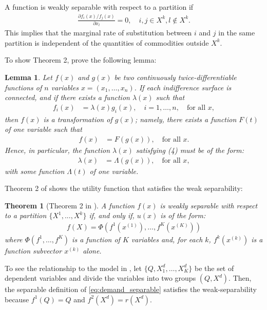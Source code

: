 \documentclass[11pt, a4paper]{article}
\newtheorem{theorem}{Theorem}
\newtheorem{lemma}{Lemma}
\theoremstyle{remark}
\begin{document}
A function is weakly separable with respect to a partition if 
\begin{align}
    \frac{\partial f_i(x)/ f_j(x)}{\partial x_l} = 0, \quad i,j\in X^k, l \notin X^k.
\end{align}
This implies that the marginal rate of substitution between $i$ and $j$ in the same partition is independent of the quantities of commodities outside $X^k$.

To show Theorem 2, \citet{goldmanNote1964} prove the following lemma:
\begin{lemma}\label{lemma_1_GU}
    Let $f(x)$ and $g(x)$ be two continuously twice-differentiable functions of $n$ variables $x=(x_1, \dots, x_n)$. If each indifference surface is connected, and if there exists a function $\lambda(x)$ such that
    \begin{align}
    f_i(x) &= \lambda(x)g_i(x), \quad i=1, \dots, n, \quad \text{for all } x,
    \end{align}
    then $f(x)$ is a transformation of $g(x)$; namely, there exists a function $F(t)$ of one variable such that
    \begin{align}
    f(x) &= F(g(x)), \quad \text{for all } x.
    \end{align}
    Hence, in particular, the function $\lambda(x)$ satisfying (4) must be of the form:
    \begin{align}
        \lambda(x) &= \Lambda(g(x)), \quad \text{for all } x,
    \end{align}
    with some function $\Lambda(t)$ of one variable.
\end{lemma}

Theorem 2 of \citet{goldmanNote1964} shows the utility function that satisfies the weak separability:
\begin{theorem}[Theorem 2 in \citet{goldmanNote1964}]\label{thorem_2_GU}
    A function $f(x)$ is weakly separable with respect to a partition $\{X^1, .. ., X^k\}$ if, and only if, $u(x)$ is of the form: 
    \begin{align}
        f(X) = \Phi(f^1(x^{(1)}),\ldots, f^K(x^{(K)})   )
    \end{align} where $\Phi(f^1,\ldots, f^K)$ is a function of $K$ variables and, for each $k$, $f^k(x^{(k)})$ is a function subvector $x^{(k)}$ alone.
\end{theorem}

To see the relationship to the model in \citet{lau1982identifying}, let $\{Q, X_{1}^{d},\ldots, X_{K}^{d}\}$ be the set of dependent variables and divide the variables into two groups $(Q, X^{d})$.
Then, the separable definition of \eqref{eq:demand_separable} satisfies the weak-separability because $f^1(Q) = Q$ and $f^2(X^d) = r(X^d)$.
\end{document}
